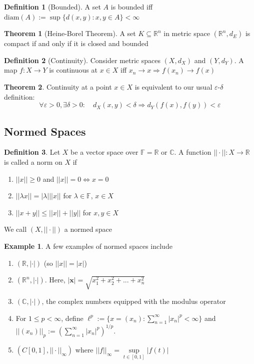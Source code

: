 \documentclass[11pt,a4paper]{article}
\theoremstyle{definition}
\newtheorem{definition}{Definition}[section]
\newtheorem{theorem}{Theorem}[section]
\newtheorem{example}{Example}[section]
\begin{document}
\begin{definition}[Bounded]
    A set $A$ is bounded iff $\text{diam} (A) := \sup \{d(x,y):x,y \in A\} < \infty$
\end{definition}

\begin{theorem}[Heine-Borel Theorem]
    A set $K \subseteq \mathbb{R}^n$ in metric space $(\mathbb{R}^n, d_E)$ is compact if and only if it is closed and bounded
\end{theorem}

\begin{definition}[Continuity]
    Consider metric spaces $(X,d_X)$ and $(Y, d_Y)$. A map $f: X \to Y$ is continuous at $x\in X$ iff $x_n \to x \Longrightarrow f(x_n) \to f(x)$
\end{definition}

\begin{theorem}
    Continuity at a point $x\in X$ is equivalent to our usual $\varepsilon$-$\delta$ definition: \[\forall \varepsilon>0, \exists \delta >0: \quad d_X(x,y) < \delta \Longrightarrow d_Y(f(x), f(y)) < \varepsilon\]
\end{theorem}

\subsection{Normed Spaces}

\begin{definition}
    Let $X$ be a vector space over $\mathbb{F} = \mathbb{R}$ or $\mathbb{C}$. A function $||\cdot ||:X \to \mathbb{R}$ is called a norm on $X$ if 
    \begin{enumerate}
        \item $||x|| \ge 0$ and $||x|| = 0 \iff x = 0$
        \item $||\lambda x|| = |\lambda |||x||$ for $\lambda \in \mathbb{F}$, $x\in X$
        \item $||x+y|| \le ||x|| + ||y||$ for $x,y \in X$
    \end{enumerate}
    We call $(X, ||\cdot ||)$ a normed space
\end{definition}

\begin{example}
    A few examples of normed spaces include
    \begin{enumerate}
        \item $(\mathbb{R}, |\cdot |)$ (so $||x|| = |x|$)
        \item $(\mathbb{R}^n, |\cdot |)$. Here, $|\mathbf{x}| = \sqrt{x_1^2 + x_2^2 + ... + x_n^2}$
        \item $(\mathbb{C}, |\cdot |)$, the complex numbers equipped with the modulus operator
        \item For $1 \le p < \infty$, define $\ell^p := \{x = (x_n): \sum \limits _{n=1}^\infty |x_n|^p < \infty\}$ and $||(x_n)||_p := (\sum \limits _{n=1}^\infty |x_n|^p)^{1/p}$. 
        \item $(C[0,1], ||\cdot ||_{\infty})$ where $||f||_{\infty } = \sup \limits _{t \in [0,1]} |f(t)|$
    \end{enumerate}
\end{example}
\end{document}
